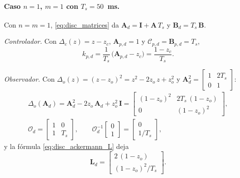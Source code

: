 \paragraph{Caso $n = 1$, $m = 1$ con $T_s = 50$~ms.} Con $n = m = 1$,
\eqref{eq:disc_matrices} da $\mathbf{A}_d = \mathbf{I} + \mathbf{A}\,T_s$ y
$\mathbf{B}_d = T_s\,\mathbf{B}$.

\textit{Controlador.} Con $\Delta_c(z) = z - z_c$, $\mathbf{A}_{p,d} = 1$ y
$\mathcal{C}_{p,d} = \mathbf{B}_{p,d} = T_s$,
\begin{equation}
k_{p,d} = \frac{1}{T_s}\,\bigl(\mathbf{A}_{p,d} - z_c\bigr) = \frac{1 - z_c}{T_s} .
\end{equation}

\textit{Observador.} Con $\Delta_o(z) = (z - z_o)^2 = z^2 - 2z_o\,z + z_o^2$ y
$\mathbf{A}_d^2 = \begin{bmatrix} 1 & 2T_s \\ 0 & 1 \end{bmatrix}$:
\begin{equation}
\begin{gathered}
\Delta_o(\mathbf{A}_d) = \mathbf{A}_d^2 - 2z_o\,\mathbf{A}_d + z_o^2\,\mathbf{I}
= \begin{bmatrix} (1 - z_o)^2 & 2T_s\,(1 - z_o) \\ 0 & (1 - z_o)^2 \end{bmatrix},
\\[4pt]
\mathcal{O}_d = \begin{bmatrix} 1 & 0 \\ 1 & T_s \end{bmatrix},
\qquad
\mathcal{O}_d^{-1}\begin{bmatrix} 0 \\ 1 \end{bmatrix} = \begin{bmatrix} 0 \\ 1/T_s \end{bmatrix},
\end{gathered}
\end{equation}
y la fórmula \eqref{eq:disc_ackermann_L} deja
\begin{equation}
\mathbf{L}_d = \begin{bmatrix} 2\,(1 - z_o) \\ (1 - z_o)^2/T_s \end{bmatrix} .
\label{eq:disc_ganancias}
\end{equation}

